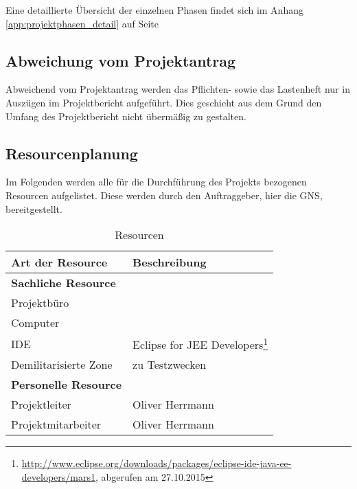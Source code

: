 \documentclass[12pt, xcolor=dvipsnames]{scrartcl}
\begin{document}
	Eine detaillierte Übersicht der einzelnen Phasen findet sich im Anhang \ref{app:projektphasen_detail} auf Seite \pageref{app:projektphasen_detail}
	

\subsection{Abweichung vom Projektantrag}

Abweichend vom Projektantrag werden das Pflichten- sowie das Lastenheft nur in Auszügen im Projektbericht aufgeführt. Dies geschieht aus dem Grund den Umfang des Projektbericht nicht übermäßig zu gestalten.

\subsection{Resourcenplanung}

Im Folgenden werden alle für die Durchführung des Projekts bezogenen Resourcen aufgelistet. Diese werden durch den Auftraggeber, hier die GNS, bereitgestellt.

\begin{savenotes}
\begin{table}[H]
	\centering
	\begin{tabular}{ll}

		\rowcolor{white!15}				
		\textbf{Art der Resource} & \textbf{Beschreibung} \\\hline		
		
		\rowcolor{MidnightBlue!15}				
		\textbf{Sachliche Resource} & \\
		Projektbüro & \\
		Computer & \\
		\hspace{1.5em} IDE & Eclipse for JEE Developers\footnote{\url{http://www.eclipse.org/downloads/packages/eclipse-ide-java-ee-developers/mars1}, abgerufen am 27.10.2015} \\
		Demilitarisierte Zone & zu Testzwecken \\
		
		\rowcolor{MidnightBlue!15}			
		\textbf{Personelle Resource} & \\
		Projektleiter & Oliver Herrmann \\
		Projektmitarbeiter & Oliver Herrmann \\
	
			    
	\end{tabular}
	\caption{Resourcen}
	\label{tab:resourcen}
\end{table}
\end{savenotes}
\end{document}
